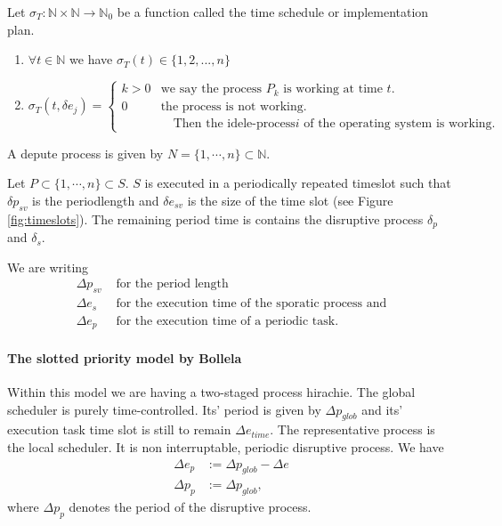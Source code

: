 	\begin{definition}
	Let $\sigma_T: \mathbb{N} \times \mathbb{N} \rightarrow \mathbb{N}_0$ be a function called the time schedule or implementation plan.
	\begin{enumerate}
	\item $\forall t \in \mathbb{N}$ we have $\sigma_T(t)\in \{1,2,...,n\}$
	\item \begin{equation}
			\sigma_T(t,\delta e_j) =
			\begin{cases}
				k > 0 & \text{we say the process $P_k$ is working at time $t$.}\\
				0 & \text{the process is not working.}\\
				  &\quad  \text{Then the idele-process$i$ of the operating system is working.}
			\end{cases}       
	\end{equation}
	\end{enumerate}
	\end{definition}
	
	A depute process is given by $ N = \{1, \cdots, n\}\subset \mathbb{N}$. 
	
	Let $P \subset \{1, \cdots, n\} \subset S$.
	$S$ is executed in a periodically repeated timeslot such that $\delta p_{sv}$ is the periodlength and $\delta e_{sv}$ is the size of the time slot (see Figure \ref{fig:timeslots}).
	The remaining period time is contains the  disruptive process $\delta_p$ and $\delta_s$.
	
	We are writing
	\begin{align}
		\Delta p_{sv} &\text{ for the period length} \\
		\Delta e_s &\text{ for the execution time of the sporatic process and}\\ 
		\Delta e_p &\text{ for the execution time of a periodic task.}
	\end{align}
	
	\paragraph{The slotted priority model by Bollela}
	\label{par:TheSlottedPriorirtyModelByBollela}
	
	Within this model we are having a two-staged process hirachie. 
	The global scheduler is purely time-controlled.
	Its' period is given by $\Delta p_{glob}$ and its' execution task time slot is still to remain $\Delta e_{time}$.
	The representative process is the local scheduler. 
	It is non interruptable, periodic disruptive process.
	We have
	\begin{align}
	\Delta e_p &:= \Delta p_{glob} - \Delta e\\
	\Delta p_{p} &:= \Delta p_{glob}, 
	\end{align}
	where $\Delta p_{p}$ denotes the period of the disruptive process.
	
